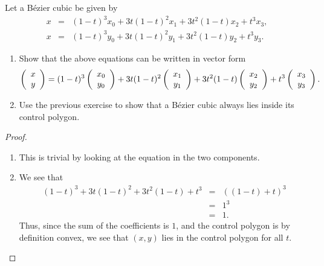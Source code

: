 \begin{exercise}{15}
    Let a B\'ezier cubic be given by
    \begin{eqnarray*}
        x & = & (1-t)^3 x_0 + 3t(1-t)^2 x_1 + 3t^2 (1-t) x_2 + t^3 x_3,\\
        x & = & (1-t)^3 y_0 + 3t(1-t)^2 y_1 + 3t^2 (1-t) y_2 + t^3 y_3.        
    \end{eqnarray*}
    
    \begin{enumerate}
        \item Show that the above equations can be written in vector form
        \begin{align*}
            \left( 
            \begin{array}{c} 
                x\\ 
                y
            \end{array}\right)
            = (1-t)^3 
            \left( 
            \begin{array}{c} 
                x_0\\ 
                y_0
            \end{array}\right) 
            + 3t(1-t)^2 
            \left( 
            \begin{array}{c} 
                x_1\\ 
                y_1
            \end{array}\right) 
            + 3t^2 (1-t) 
            \left( 
            \begin{array}{c} 
                x_2\\ 
                y_2
            \end{array}\right) 
            + t^3 
            \left( 
            \begin{array}{c} 
                x_3\\ 
                y_3
            \end{array}\right).
        \end{align*}
        \item Use the previous exercise to show that a B\'{e}zier cubic always lies inside its control polygon.
    \end{enumerate}
\end{exercise}
\begin{proof}
    \begin{enumerate}
        \item This is trivial by looking at the equation in the two components. 
        \item We see that
        \begin{eqnarray*}
            (1-t)^3 + 3t(1-t)^2 + 3t^2 (1-t) + t^3
            & = & ( (1-t) + t)^3\\
            & = & 1^3\\
            & = & 1.
        \end{eqnarray*}
        Thus, since the sum of the coefficients is $1$, and the control polygon is by definition convex, we see that $(x,y)$ lies in the control polygon for all $t$.
    \end{enumerate}
\end{proof}

